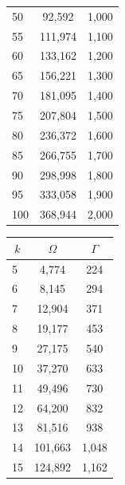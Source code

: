 \documentclass[a4paper,11pt]{article}
\begin{document}
\begin{appendix}
\begin{table}[ht]
{\begin{tabular}{l|cc}
    50                                   & 92,592     & 1,000      \\
    55                                   & 111,974    & 1,100      \\
    60                                   & 133,162    & 1,200      \\
    65                                   & 156,221    & 1,300      \\
    70                                   & 181,095    & 1,400       \\
    75                                   & 207,804    & 1,500      \\
    80                                   & 236,372    & 1,600      \\
    85                                   & 266,755    & 1,700      \\
    90                                   & 298,998    & 1,800      \\
    95                                   & 333,058    & 1,900      \\
    100                                  & 368,944    & 2,000     
  \end{tabular}
  \hspace{1.0cm}
  \begin{tabular}{l|cc}
    \multicolumn{1}{c|}{\(k\)} & \(\Omega\) & \(\Gamma\) \\ \hline
    5                               & 4,774      & 224        \\
    6                               & 8,145      & 294        \\
    7                               & 12,904     & 371        \\
    8                               & 19,177     & 453        \\
    9                               & 27,175     & 540        \\
    10                              & 37,270     & 633        \\
    11                              & 49,496     & 730        \\
    12                              & 64,200     & 832        \\
    13                              & 81,516     & 938        \\
    14                              & 101,663    & 1,048      \\
    15                              & 124,892    & 1,162      \\

\end{tabular}}
\end{table}
\end{appendix}
\end{document}
